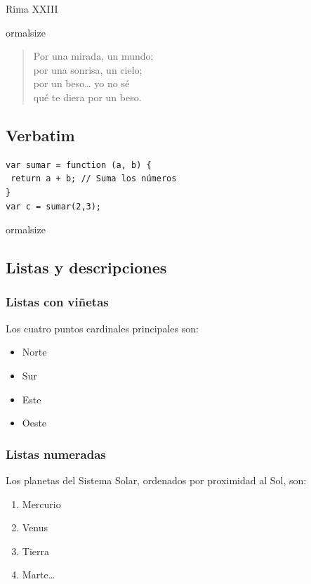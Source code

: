 \documentclass[11pt,twoside,a4paper]{article}
\begin{document}
\large Rima XXIII

ormalsize
\begin{verse}
  Por una mirada, un mundo;\\
  por una sonrisa, un cielo;\\
  por un beso\ldots{} yo no sé\\
  qué te diera por un beso.
\end{verse}

\subsection{Verbatim}
\label{sec:verbatim}
\scriptsize
\begin{verbatim}
var sumar = function (a, b) {
 return a + b; // Suma los números
}
var c = sumar(2,3);
\end{verbatim}

ormalsize

\subsection{Listas y descripciones}
\label{sec:listasdescripciones}

\subsubsection{Listas con viñetas}
\label{sec:listasviñetas}

Los cuatro puntos cardinales principales son:
\begin{itemize}
\item Norte
\item Sur
\item Este
\item Oeste
\end{itemize}

\subsubsection{Listas numeradas}
\label{sec:listasnumeradas}

Los planetas del Sistema Solar, ordenados por proximidad al Sol, son:
\begin{enumerate}
\item Mercurio
\item Venus
\item Tierra
\item Marte\ldots{}
\end{enumerate}
\end{document}
